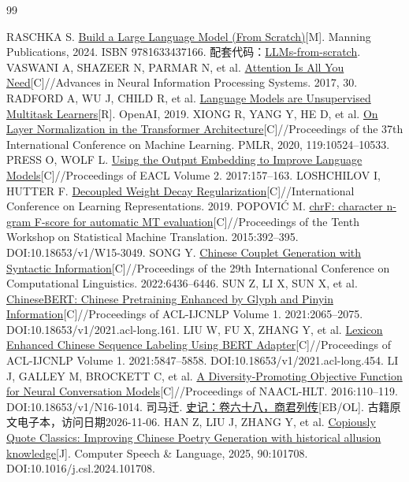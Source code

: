 \begin{thebibliography}{99}
\small\raggedright\setlength{\itemsep}{5pt}
 RASCHKA S. \href{https://www.manning.com/books/build-a-large-language-model-from-scratch}{Build a Large Language Model (From Scratch)}[M]. Manning Publications, 2024. ISBN 9781633437166. 配套代码：\href{https://github.com/rasbt/LLMs-from-scratch}{LLMs-from-scratch}.
 VASWANI A, SHAZEER N, PARMAR N, et al. \href{https://papers.neurips.cc/paper_files/paper/2017/hash/3f5ee243547dee91fbd053c1c4a845aa-Abstract.html}{Attention Is All You Need}[C]//Advances in Neural Information Processing Systems. 2017, 30.
 RADFORD A, WU J, CHILD R, et al. \href{https://cdn.openai.com/better-language-models/language_models_are_unsupervised_multitask_learners.pdf}{Language Models are Unsupervised Multitask Learners}[R]. OpenAI, 2019.
 XIONG R, YANG Y, HE D, et al. \href{https://proceedings.mlr.press/v119/xiong20b.html}{On Layer Normalization in the Transformer Architecture}[C]//Proceedings of the 37th International Conference on Machine Learning. PMLR, 2020, 119:10524--10533.
 PRESS O, WOLF L. \href{https://aclanthology.org/E17-2025/}{Using the Output Embedding to Improve Language Models}[C]//Proceedings of EACL Volume 2. 2017:157--163.
 LOSHCHILOV I, HUTTER F. \href{https://arxiv.org/abs/1711.05101}{Decoupled Weight Decay Regularization}[C]//International Conference on Learning Representations. 2019.
 POPOVIĆ M. \href{https://aclanthology.org/W15-3049/}{chrF: character n-gram F-score for automatic MT evaluation}[C]//Proceedings of the Tenth Workshop on Statistical Machine Translation. 2015:392--395. DOI:10.18653/v1/W15-3049.
 SONG Y. \href{https://aclanthology.org/2022.coling-1.560/}{Chinese Couplet Generation with Syntactic Information}[C]//Proceedings of the 29th International Conference on Computational Linguistics. 2022:6436--6446.
 SUN Z, LI X, SUN X, et al. \href{https://aclanthology.org/2021.acl-long.161/}{ChineseBERT: Chinese Pretraining Enhanced by Glyph and Pinyin Information}[C]//Proceedings of ACL-IJCNLP Volume 1. 2021:2065--2075. DOI:10.18653/v1/2021.acl-long.161.
 LIU W, FU X, ZHANG Y, et al. \href{https://aclanthology.org/2021.acl-long.454/}{Lexicon Enhanced Chinese Sequence Labeling Using BERT Adapter}[C]//Proceedings of ACL-IJCNLP Volume 1. 2021:5847--5858. DOI:10.18653/v1/2021.acl-long.454.
 LI J, GALLEY M, BROCKETT C, et al. \href{https://aclanthology.org/N16-1014/}{A Diversity-Promoting Objective Function for Neural Conversation Models}[C]//Proceedings of NAACL-HLT. 2016:110--119. DOI:10.18653/v1/N16-1014.
 司马迁. \href{https://zh.wikisource.org/wiki/史記/卷068}{史记：卷六十八，商君列传}[EB/OL]. 古籍原文电子本，访问日期2026-11-06.
 HAN Z, LIU J, ZHANG Y, et al. \href{https://doi.org/10.1016/j.csl.2024.101708}{Copiously Quote Classics: Improving Chinese Poetry Generation with historical allusion knowledge}[J]. Computer Speech \& Language, 2025, 90:101708. DOI:10.1016/j.csl.2024.101708.
\end{thebibliography}
